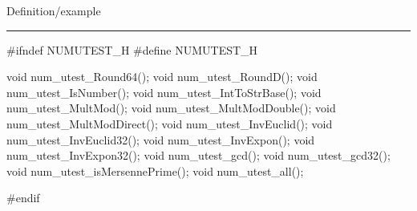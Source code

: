 
Definition/example

\bigskip
\hrule
\code
#ifndef NUMUTEST_H
#define NUMUTEST_H
\endcode

\code

void num_utest_Round64();
void num_utest_RoundD();
void num_utest_IsNumber();
void num_utest_IntToStrBase();
void num_utest_MultMod();
void num_utest_MultModDouble();
void num_utest_MultModDirect();
void num_utest_InvEuclid();
void num_utest_InvEuclid32();
void num_utest_InvExpon();
void num_utest_InvExpon32();
void num_utest_gcd();
void num_utest_gcd32();
void num_utest_isMersennePrime();
void num_utest_all();

#endif
\endcode
